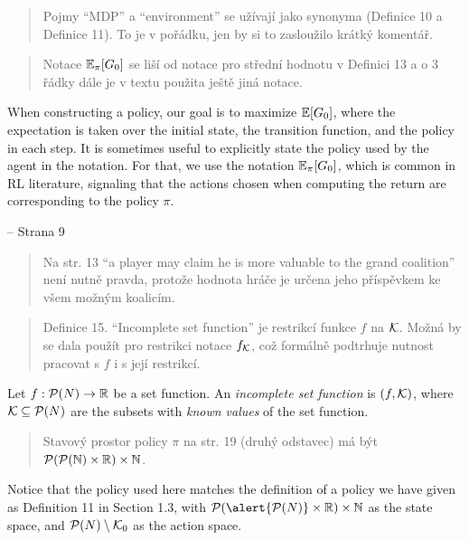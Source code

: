 \documentclass[aspectratio=169]{beamer}
\begin{document}
\begin{frame}
	\begin{quote}
		Pojmy “MDP” a “environment” se užívají jako synonyma (Definice 10 a Definice 11). To je v pořádku, jen by si to zasloužilo krátký komentář.
	\end{quote}
\end{frame}

\begin{frame}
	\begin{quote}
		Notace $ \operatorname*{\mathbb{E}}_\pi [G_0] $ se liší od notace pro střední hodnotu v Definici 13 a o 3 řádky dále je v textu použita ještě jiná notace.
	\end{quote}

When constructing a policy, our goal is to maximize $ \operatorname*{\mathbb{E}}\!\left[ G_0 \right] $, where the expectation is taken over the initial state, the transition function, and the policy in each step.
It is sometimes useful to explicitly state the policy used by the agent in the notation.
For that, we use the notation $ \operatorname*{\mathbb{E}}_\pi\!\left[ G_0 \right] $, which is common in RL literature, signaling that the actions chosen when computing the return are corresponding to the policy $ \pi $.

\hfill -- Strana 9

\end{frame}

\begin{frame}
	\begin{quote}
		Na str. 13 “a player may claim he is more valuable to the grand coalition” není nutně pravda, protože hodnota hráče je určena jeho příspěvkem ke všem možným koalicím.
	\end{quote}
\end{frame}

\begin{frame}
	\begin{quote}
		Definice 15. “Incomplete set function” je restrikcí funkce $ f $ na $ \mathcal{K} $. Možná by se dala použít pro restrikci notace $ f_{\mathcal{K}} $, což formálně podtrhuje nutnost pracovat s $ f $ i s její restrikcí.
	\end{quote}

	\vspace{2em}
	\begin{definition}
		Let $ f: \mathcal{P}\!\left(N\right) \to \mathbb{R} $ be a set function.
		An \emph{incomplete set function} is $ \left( f, \mathcal{K} \right) $, where $ \mathcal{K} \subseteq \mathcal{P}\!\left(N\right) $ are the subsets with \emph{known values} of the set function.
	\end{definition}
\end{frame}

\begin{frame}
	\begin{quote}
		Stavový prostor policy $ \pi $ na str. 19 (druhý odstavec) má být $ \mathcal{P}\!\left(\mathcal{P}\!\left(\mathbb{N}\right) \times \mathbb{R}\right) \times \mathbb{N} $.
	\end{quote}
	\vspace{2em}
	Notice that the policy used here matches the definition of a policy we have given as Definition 11 in Section 1.3, with $ \pot {\alert{\pot N} \times \R} \times \N $ as the state space, and $ \mathcal{P}\!\left(N\right) \setminus \mathcal{K}_0 $ as the action space.
\end{frame}
\end{document}
